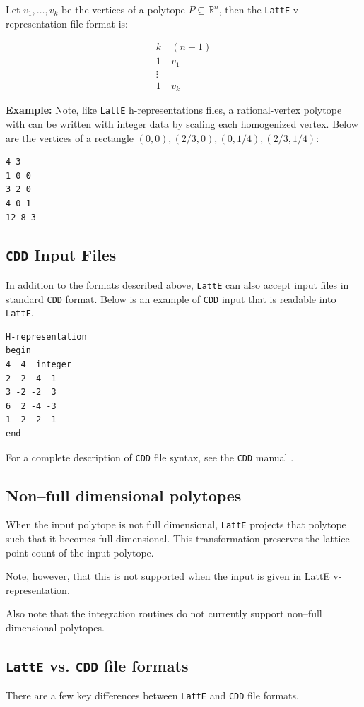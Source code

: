 \documentclass{article}
\newcommand{\R}{{\mathbb R}}
\newcommand{\latte}{{\tt LattE}\xspace}
\newcommand{\cdd}{{\tt CDD}\xspace}
\newcommand{\example}{{\bf Example:\space}}
\begin{document}
Let $v_1, \dots, v_k$ be the vertices of a polytope $P \subseteq \R^n$, then the \latte v-representation file format is:

\begin{align*}
        k &\: (n+1)\\
        1 &\: v_1\\
        \vdots & \\
        1 &\: v_k
\end{align*}


\example
Note, like \latte h-representations files, a rational-vertex polytope with can be written with integer data by scaling each homogenized vertex. Below are the vertices of a rectangle $(0,0), (2/3,0), (0,1/4), (2/3, 1/4)$:
\begin{verbatim}
4 3
1 0 0
3 2 0
4 0 1
12 8 3
\end{verbatim}

\subsection{\cdd Input Files}
In addition to the formats described above, {\tt LattE} can also
accept input files in standard \cdd format. Below is
an example of \cdd input that is readable into \latte.
\begin{verbatim}
H-representation
begin
4  4  integer
2 -2  4 -1
3 -2 -2  3
6  2 -4 -3
1  2  2  1
end
\end{verbatim}

For a complete description of \cdd file syntax, see the \cdd manual \cite{fukuda}.

\subsection{Non--full dimensional polytopes}

When the input polytope is not full dimensional, \latte projects that polytope
such that it becomes full dimensional. This transformation preserves the
lattice point count of the input polytope. 

Note, however, that this is not supported when the input is given in LattE
v-representation. 

Also note that the integration routines do not currently support non--full
dimensional polytopes.

\subsection{\latte vs. \cdd file formats}
There are a few key differences between \latte and \cdd file formats.
\end{document}
